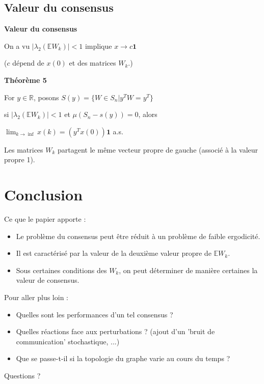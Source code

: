 \documentclass{beamer}
\begin{document}
	\subsection{Valeur du consensus}
\begin{frame}
	\textbf{Valeur du consensus}

	On a vu $| \lambda_2(\mathbb{E}W_k)| < 1$ implique $x \to c\textbf{1}$

	($c$ dépend de $x(0)$ et des matrices $W_k$.)

	\bigbreak
	\pause
	\textbf{Théorème 5}

	For $y \in \mathbb{R}$, posons $S(y) = \{W \in S_n | y^TW = y^T\}$

	si $| \lambda_2(\mathbb{E}W_k)| < 1$ et $\mu (S_n - s(y)) = 0$, alors

	\begin{center}
		$\lim_{k \to \inf}x(k) = (y^Tx(0))\textbf{1}$ \quad a.s.		
	\end{center}
	\pause
	Les matrices $W_k$ partagent le même vecteur propre de gauche
	(associé à la valeur propre 1).
\end{frame}


\section*{Conclusion}
\begin{frame}
	Ce que le papier apporte :
	\begin{itemize}
		\item Le problème du consensus peut être réduit à un problème de faible ergodicité.
		\pause
		\item Il est caractérisé par la valeur de la deuxième valeur propre de $\mathbb{E}W_k$.
		\pause
		\item Sous certaines conditions des $W_k$, on peut déterminer de manière certaines la valeur de consensus.
	\end{itemize}
	\pause
	Pour aller plus loin :
	\begin{itemize}
		\item Quelles sont les performances d'un tel consensus ?
		\pause
		\item Quelles réactions face aux perturbations ? (ajout d'un 'bruit de communication' stochastique, ...)
		\pause
		\item Que se passe-t-il si la topologie du graphe varie au cours du temps ?
	\end{itemize}
\end{frame}

\begin{frame}
	\begin{center}
		\LARGE Questions ?
	\end{center}
\end{frame}
\end{document}
